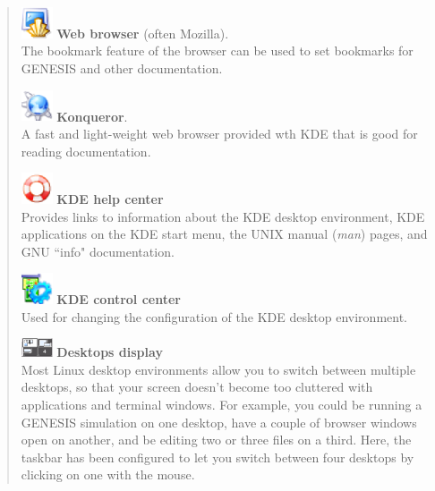 \documentclass[12pt]{article}
\begin{document}
\begin{quote}
   \includegraphics[width=0.075\textwidth]{figures/konsole.eps} {\bf Web browser} (often Mozilla).\\
   The bookmark feature of the browser can be used to set bookmarks for GENESIS and other documentation.

   \includegraphics[width=0.075\textwidth]{figures/konqueror.eps} {\bf Konqueror}.\\
   A fast and light-weight web browser provided wth KDE that is good for reading documentation.

   \includegraphics[width=0.075\textwidth]{figures/khelpcenter.eps} {\bf KDE help center }\\
   Provides links to information about the KDE desktop environment, KDE applications on the KDE start menu, the UNIX manual ({\it man}) pages, and GNU ``info" documentation.

   \includegraphics[width=0.075\textwidth]{figures/kcontrol.eps} {\bf KDE control center}\\
   Used for changing the configuration of the KDE desktop environment.
	
   \includegraphics[width=0.075\textwidth]{figures/desktops.eps} {\bf Desktops display}\\
   Most Linux desktop environments allow you to switch between multiple desktops, so that your screen doesn't become too cluttered with applications and terminal windows. For example, you could be running a GENESIS simulation on one desktop, have a couple of browser windows open on another, and be editing two or three files on a third. Here, the taskbar has been configured to let you switch between four desktops by clicking on one with the mouse. 
\end{quote}
\end{document}
